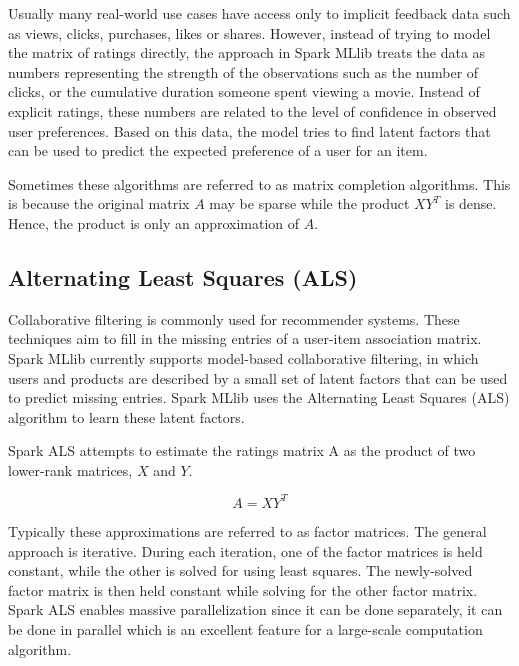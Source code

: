 \documentclass[main.tex]{thesis.tex}
\begin{document}
Usually many real-world use cases have access only to implicit feedback data such as views, clicks, purchases, likes or shares.
However, instead of trying to model the matrix of ratings directly, the approach in Spark MLlib treats the data as numbers representing the strength of the observations such as the number of clicks, or the cumulative duration someone spent viewing a movie.
Instead of explicit ratings, these numbers are related to the level of confidence in observed user preferences.
Based on this data, the model tries to find latent factors that can be used to predict the expected preference of a user for an item. \cite{spark14}

Sometimes these algorithms are referred to as matrix completion algorithms.
This is because the original matrix $A$ may be sparse while the product $XY^T$ is dense.
Hence, the product is only an approximation of $A$. \cite{ryza15}

\subsection{Alternating Least Squares (ALS)}

Collaborative filtering is commonly used for recommender systems.
These techniques aim to fill in the missing entries of a user-item association matrix.
Spark MLlib currently supports model-based collaborative filtering, in which users and products are described by a small set of latent factors that can be used to predict missing entries.
Spark MLlib uses the Alternating Least Squares (ALS) algorithm to learn these latent factors. \cite{spark14}

Spark ALS attempts to estimate the ratings matrix A as the product of two lower-rank matrices, $X$ and $Y$. \cite{als14}

\begin{equation}
A = XY^T
\end{equation}

Typically these approximations are referred to as factor matrices.
The general approach is iterative.
During each iteration, one of the factor matrices is held constant, while the other is solved for using least squares. The newly-solved factor matrix is then held constant while solving for the other factor matrix. \cite{als14}
Spark ALS enables massive parallelization since it can be done separately, it can be done in parallel which is an excellent feature for a large-scale computation algorithm. \cite{ryza15}
\end{document}
